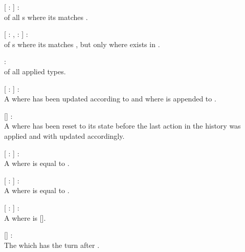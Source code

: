 \begin{dlist}
  \item {}[  :  ] : \\
   of all s where its  matches
  .
  
  \item {}[  : ,  :  ] : \\
   of s where its  matches
  , but only  where  exists in
  .
  
  \item {} : \\
   of all applied  types.
  
  \item {}[  :  ] : \\
  A  where  has been updated according to
   and where  is appended to
  .
  
  \item {}[] : \\
  A  where  has been reset to its state before the last action
  in the history was applied and with  updated accordingly.
  
  \item {}[  :  ] : \\
  A  where  is equal to .
  
  \item {}[  :  ] : \\
  A  where  is equal to .
  
  \item {}[  :  ] : \\
  A  where  is [].
  
  \item {}[] : \\
  The  which has the turn after .
\end{dlist}

